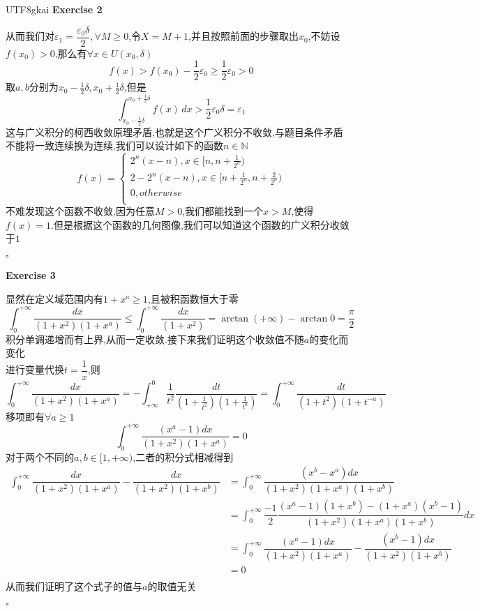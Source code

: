 \documentclass{article}
\newenvironment{exercise}[1]{%
{\textbf{Exercise #1} \\ 
    }
}{
  \hfill $\square$ 
  \par\bigskip 
}
\newcommand{\NN}{\mathbb{N}}
\begin{document}
\begin{CJK}{UTF8}{gkai}
\begin{exercise}{2}
    从而我们对$\varepsilon_1 = \dfrac{\varepsilon_0 \delta}{2},\forall M \geq 0$,令$X = M + 1$,并且按照前面的步骤取出$x_0$,不妨设$f(x_0) > 0$,那么有$\forall x \in U(x_0,\delta)$
    \[f(x) > f(x_0) - \frac{1}{2}\varepsilon_0 \geq \frac{1}{2}\varepsilon_0 > 0\]
    取$a,b$分别为$x_0 - \frac{1}{2}\delta,x_0 + \frac{1}{2}\delta$,但是
    \[\int_{x_0 - \frac{1}{2}\delta}^{x_0 + \frac{1}{2}\delta} f(x)\, dx > \frac{1}{2}\varepsilon_0\delta = \varepsilon_1\]
    这与广义积分的柯西收敛原理矛盾,也就是这个广义积分不收敛,与题目条件矛盾\\

    不能将一致连续换为连续,我们可以设计如下的函数$n \in \NN$
    \[f(x) = \begin{cases}
        2^n(x - n),x\in[n,n + \frac{1}{2^n})\\
        2 - 2^n(x - n),x\in[n + \frac{1}{2^n},n + \frac{2}{2^n})\\  
        0,otherwise\\
    \end{cases}\]
    不难发现这个函数不收敛,因为任意$M>0$,我们都能找到一个$x > M$,使得$f(x) = 1$.但是根据这个函数的几何图像,我们可以知道这个函数的广义积分收敛于$1$
\end{exercise}


\begin{exercise}{3}
    显然在定义域范围内有$1 + x^a \geq 1$,且被积函数恒大于零
    \[\int_{0}^{+\infty}\dfrac{dx}{(1 + x^2)(1 + x^a)}\leq \int_{0}^{+\infty}\dfrac{dx}{(1 + x^2)} = \arctan (+\infty) - \arctan 0 = \dfrac{\pi}{2}\]
    积分单调递增而有上界,从而一定收敛.接下来我们证明这个收敛值不随$a$的变化而变化\\

    进行变量代换$t = \dfrac{1}{x}$,则
    \[\int_{0}^{+\infty}\dfrac{dx}{(1 + x^2)(1 + x^a)} =-\int_{+\infty}^{0}\dfrac{1}{t^2}\dfrac{dt}{(1 + \frac{1}{t^2})(1 + \frac{1}{t^a})} = \int_{0}^{+\infty}\dfrac{dt}{(1 + t^2)(1 + t^{-a})}\]
    移项即有$\forall a \geq 1$
    \[\int_{0}^{+\infty}\dfrac{(x^a -1) dx}{(1 + x^2)(1 + x^a)} = 0\]
    对于两个不同的$a,b\in[1,+\infty)$,二者的积分式相减得到
    \[
    \begin{aligned}
        \int_{0}^{+\infty}\dfrac{dx}{(1 + x^2)(1 + x^a)} - \dfrac{dx}{(1 + x^2)(1 + x^b)} &= \int_{0}^{+\infty}\dfrac{(x^b - x^a)dx}{(1 + x^2)(1 + x^a)(1 + x^b)}\\
        &= \int_{0}^{+\infty}\dfrac{-1}{2}\dfrac{(x^a - 1)(1 + x^b) - (1 + x^a)(x^b - 1)}{(1 + x^2)(1 + x^a)(1 + x^b)}dx\\
        &=\int_{0}^{+\infty}\dfrac{(x^a -1) dx}{(1 + x^2)(1 + x^a)} - \dfrac{(x^b -1) dx}{(1 + x^2)(1 + x^b)}\\
        &=0\\
    \end{aligned}    
    \]
    从而我们证明了这个式子的值与$a$的取值无关
\end{exercise}



\end{CJK}
\end{document}
